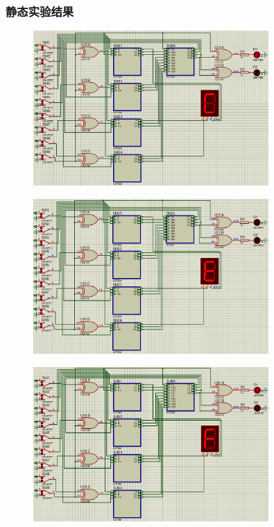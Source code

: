 \documentclass[UTF8, a4paper, 11pt]{article}
\begin{document}
\subsubsection{静态实验结果}
\begin{figure}[H]
    \centering
    \includegraphics[width=0.8\textwidth]{1.png}
\end{figure}
\begin{figure}[H]
    \centering
    \includegraphics[width=0.8\textwidth]{2.png}
\end{figure}
\begin{figure}[H]
    \centering
    \includegraphics[width=0.8\textwidth]{3.png}
\end{figure}
\end{document}
